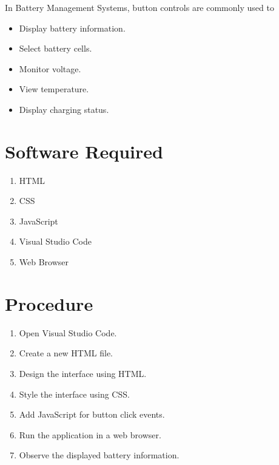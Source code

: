 \documentclass[12pt,a4paper]{report}
\begin{document}
In Battery Management Systems, button controls are commonly used to

\begin{itemize}

\item Display battery information.

\item Select battery cells.

\item Monitor voltage.

\item View temperature.

\item Display charging status.

\end{itemize}

\section{Software Required}

\begin{enumerate}

\item HTML

\item CSS

\item JavaScript

\item Visual Studio Code

\item Web Browser

\end{enumerate}

\section{Procedure}

\begin{enumerate}

\item Open Visual Studio Code.

\item Create a new HTML file.

\item Design the interface using HTML.

\item Style the interface using CSS.

\item Add JavaScript for button click events.

\item Run the application in a web browser.

\item Observe the displayed battery information.

\end{enumerate}
\end{document}
